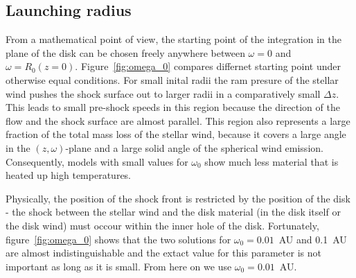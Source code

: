 \subsection{Launching radius}
From a mathematical point of view, the starting point of the integration in the plane of the disk can be chosen freely anywhere between $\omega=0$ and $\omega=R_0(z=0)$. Figure~\ref{fig:omega_0} compares differnet starting point under otherwise equal conditions. For small inital radii the ram presure of the stellar wind pushes the shock surface out to larger radii in a comparatively small $\Delta z$. This leads to small pre-shock speeds in this region because the direction of the flow and the shock surface are almost parallel. This region also represents a large fraction of the total mass loss of the stellar wind, because it covers a large angle in the $(z,\omega)$-plane and a large solid angle of the spherical wind emission. Consequently, models with small values for $\omega_0$ show much less material that is heated up high temperatures. 

Physically, the position of the shock front is restricted by the position of the disk - the shock between the stellar wind and the disk material (in the disk itself or the disk wind) must occour within the inner hole of the disk. Fortunately, figure~\ref{fig:omega_0} shows that the two solutions for $\omega_0=0.01$~AU and 0.1~AU are almost indistinguishable and the extact value for this parameter is not important as long as it is small. From here on we use $\omega_0 = 0.01$~AU.